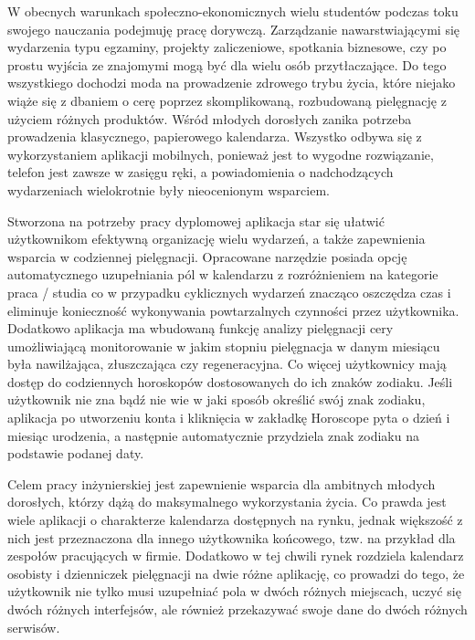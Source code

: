 W obecnych warunkach społeczno-ekonomicznych wielu studentów podczas toku swojego nauczania podejmuję pracę dorywczą. Zarządzanie nawarstwiającymi się wydarzenia typu egzaminy, projekty zaliczeniowe, spotkania biznesowe, czy po prostu wyjścia ze znajomymi mogą być dla wielu osób przytłaczające. Do tego wszystkiego dochodzi moda na prowadzenie zdrowego trybu życia, które niejako wiąże się z dbaniem o cerę poprzez skomplikowaną, rozbudowaną pielęgnację z użyciem różnych produktów. Wśród młodych dorosłych zanika potrzeba prowadzenia klasycznego, papierowego kalendarza. Wszystko odbywa się z wykorzystaniem aplikacji mobilnych, ponieważ jest to wygodne rozwiązanie, telefon jest zawsze w zasięgu ręki, a powiadomienia o nadchodzących wydarzeniach wielokrotnie były nieocenionym wsparciem.

Stworzona na potrzeby pracy dyplomowej aplikacja star się ułatwić użytkownikom efektywną organizację wielu wydarzeń, a także zapewnienia wsparcia w codziennej pielęgnacji. Opracowane narzędzie posiada opcję automatycznego uzupełniania pól w kalendarzu z rozróżnieniem na kategorie praca / studia co w przypadku cyklicznych wydarzeń znacząco oszczędza czas i eliminuje konieczność wykonywania powtarzalnych czynności przez użytkownika. Dodatkowo aplikacja ma wbudowaną funkcję analizy pielęgnacji cery umożliwiającą monitorowanie w jakim stopniu pielęgnacja w danym miesiącu była nawilżająca, złuszczająca czy regeneracyjna. Co więcej użytkownicy mają dostęp do codziennych horoskopów dostosowanych do ich znaków zodiaku. Jeśli użytkownik nie zna bądź nie wie w jaki sposób określić swój znak zodiaku, aplikacja po utworzeniu konta i kliknięcia w zakładkę Horoscope pyta o dzień i miesiąc urodzenia, a następnie automatycznie przydziela znak zodiaku na podstawie podanej daty.

Celem pracy inżynierskiej jest zapewnienie wsparcia dla ambitnych młodych dorosłych, którzy dążą do maksymalnego wykorzystania życia. Co prawda jest wiele aplikacji o charakterze kalendarza dostępnych na rynku, jednak większość z nich jest przeznaczona dla innego użytkownika końcowego, tzw. na przykład dla zespołów pracujących w firmie. Dodatkowo
w tej chwili rynek rozdziela kalendarz osobisty i dzienniczek pielęgnacji na dwie różne aplikację, co prowadzi do tego, że użytkownik nie tylko musi uzupełniać pola w dwóch różnych miejscach, uczyć się dwóch różnych interfejsów, ale również przekazywać swoje dane do dwóch różnych serwisów.

